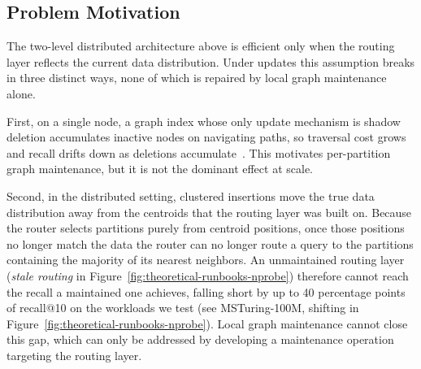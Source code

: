 \documentclass[sigconf,review,anonymous]{acmart}
\newcommand{\yc}[1]{\textcolor{blue}{(YC: #1)}}
\begin{document}
    

\subsection{Problem Motivation}


    \label{sec:motivation}
    The two-level distributed architecture above is efficient only when the routing layer reflects the current data distribution. Under updates this assumption breaks in three distinct ways, none of which is repaired by local graph maintenance alone.

    First, on a single node, a graph index whose only update mechanism is shadow deletion accumulates inactive nodes on navigating paths, so traversal cost grows and recall drifts down as deletions accumulate~\cite{singh2021freshdiskann, yu2025topology}. This motivates per-partition graph maintenance, but it is not the dominant effect at scale.
    
    Second, in the distributed setting, clustered insertions move the true data distribution away from the centroids that the routing layer was built on. Because the router selects partitions purely from centroid positions, once those positions no longer match the data the router can no longer route a query to the partitions containing the majority of its nearest neighbors. An unmaintained routing layer (\emph{stale routing} in Figure~\ref{fig:theoretical-runbooks-nprobe}) therefore cannot reach the recall a maintained one achieves, falling short by up to 40 percentage points of recall@10 on the workloads we test (see MSTuring-100M, shifting in Figure~\ref{fig:theoretical-runbooks-nprobe}). Local graph maintenance cannot close this gap, which can only be addressed by developing a maintenance operation targeting the routing layer.
\end{document}
